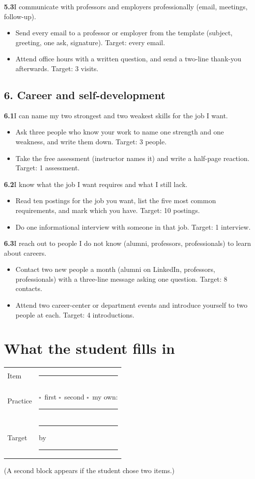 \documentclass[11pt,letterpaper]{article}
\newcommand{\bx}{$\square$}
\newcommand{\itemhead}[2]{\par\vspace{6pt}\noindent\textbf{#1}\quad #2\par\vspace{-4pt}}
\newenvironment{practices}{\begin{itemize}[leftmargin=2.2em,itemsep=1pt,topsep=2pt,label=\bx]}{\end{itemize}}
\begin{document}
\itemhead{5.3}{I communicate with professors and employers professionally (email, meetings, follow-up).}
\begin{practices}
\item Send every email to a professor or employer from the template (subject, greeting, one ask, signature). Target: every email.
\item Attend office hours with a written question, and send a two-line thank-you afterwards. Target: 3 visits.
\end{practices}

\subsection*{6. Career and self-development}

\itemhead{6.1}{I can name my two strongest and two weakest skills for the job I want.}
\begin{practices}
\item Ask three people who know your work to name one strength and one weakness, and write them down. Target: 3 people.
\item Take the free assessment (instructor names it) and write a half-page reaction. Target: 1 assessment.
\end{practices}

\itemhead{6.2}{I know what the job I want requires and what I still lack.}
\begin{practices}
\item Read ten postings for the job you want, list the five most common requirements, and mark which you have. Target: 10 postings.
\item Do one informational interview with someone in that job. Target: 1 interview.
\end{practices}

\itemhead{6.3}{I reach out to people I do not know (alumni, professors, professionals) to learn about careers.}
\begin{practices}
\item Contact two new people a month (alumni on LinkedIn, professors, professionals) with a three-line message asking one question. Target: 8 contacts.
\item Attend two career-center or department events and introduce yourself to two people at each. Target: 4 introductions.
\end{practices}

\section*{What the student fills in}

\begin{tabularx}{\linewidth}{@{}lX@{}}
\toprule
Item & \rule{8cm}{0.4pt} \\
Practice & \bx\ first \quad \bx\ second \quad \bx\ my own: \rule{5cm}{0.4pt} \\
Target & \rule{3cm}{0.4pt} by \rule{3cm}{0.4pt} \\
\bottomrule
\end{tabularx}

\vspace{4pt}
(A second block appears if the student chose two items.)
\end{document}
